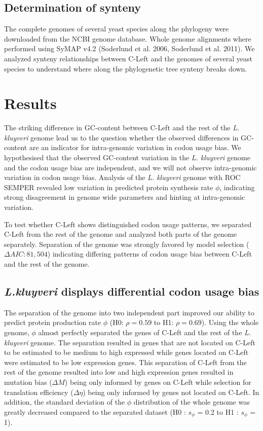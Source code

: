 \documentclass[letter,12pt]{article}
\begin{document}
\subsection{Determination of synteny}	
The complete genomes of several yeast species along the phylogeny were downloaded from the NCBI genome database.
Whole genome alignments where performed using SyMAP v4.2 (Soderlund et al. 2006, Soderlund et al. 2011).
We analyzed synteny relationships between C-Left and the genomes of several yeast species to understand where along the phylogenetic tree synteny breaks down.
  
	
\section*{Results}
The striking difference in GC-content between C-Left and the rest of the \textit{L. kluyveri} genome lead us to the question whether the observed differences in GC-content are an indicator for intra-genomic variation in codon usage bias.
We hypothesised that the observed GC-content variation in the \textit{L. kluyveri} genome and the codon usage bias are independent, and we will not observe intra-genomic variation in codon usage bias.
Analysis of the \textit{L. kluyveri} genome with ROC SEMPER revealed low variation in predicted protein synthesis rate $\phi$, indicating strong disagreement in genome wide parameters and hinting at intra-genomic variation.
  
To test whether C-Left shows distinguished codon usage patterns, we separated C-Left from the rest of the genome and analyzed both parts of the genome separately.
Separation of the genome was strongly favored by model selection ($\Delta AIC: 81,504$) indicating differing patterns of codon usage bias between C-Left and the rest of the genome.

\subsection*{\textit{L.kluyveri} displays differential codon usage bias}
The separation of the genome into two independent part improved our ability to predict protein production rate $\phi$ (H0: $\rho = 0.59$ to H1: $\rho = 0.69$).
Using the whole genome, $\phi$ almost perfectly separated the genes of C-Left and the rest of the \textit{L. kluyveri} genome. 
The separation resulted in genes that are not located on C-Left to be estimated to be medium to high expressed while genes located on C-Left were estimated to be low expression genes. 
This separation of C-Left from the rest of the genome resulted into low and high expression genes resulted in mutation bias ($\Delta M$) being only informed by genes on C-Left while selection for translation efficiency ($\Delta \eta$) being only informed by genes not located on C-Left. 
In addition, the standard deviation of the $\phi$ distribution of the whole genome was greatly decreased compared to the separated dataset (H0 : $s_{\phi}$ = 0.2 to H1 : $s_{\phi}$ = 1).
\end{document}
